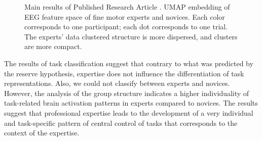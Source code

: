 \begin{figure}[ht]
\begin{center}

\captionsetup{justification=justified}
\caption[Main results of Published Research Article ]{Main results of Published Research Article . UMAP embedding of EEG feature space of fine motor experts and novices. Each color corresponds to one participant; each dot corresponds to one trial. The experts' data clustered structure is more dispersed, and clusters are more compact.}
\label{fig:results4}
\end{center}
\end{figure}

\noindent The results of task classification suggest that contrary to what was predicted by the reserve hypothesis, expertise does not influence the differentiation of task representations. Also, we could not classify between experts and novices. However, the analysis of the group structure indicates a higher individuality of task-related brain activation patterns in experts compared to novices. The results suggest that professional expertise leads to the development of a very individual and task-specific pattern of central control of tasks that corresponds to the context of the expertise.

